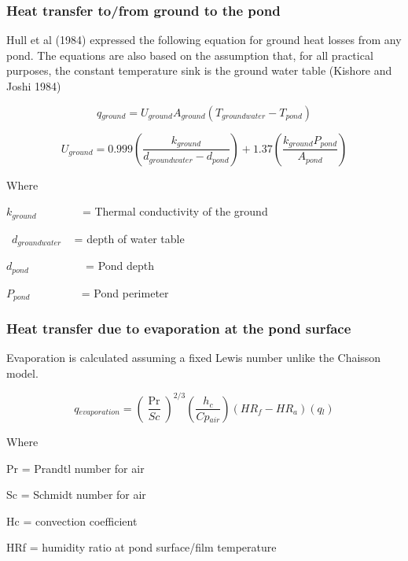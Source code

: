 \subsubsection{Heat transfer to/from ground to the pond}\label{heat-transfer-tofrom-ground-to-the-pond}

Hull et al (1984) expressed the following equation for ground heat losses from any pond. The equations are also based on the assumption that, for all practical purposes, the constant temperature sink is the ground water table (Kishore and Joshi 1984)

\begin{equation}
q{}_{ground} = U{}_{ground}A{}_{ground}(T{}_{groundwater} - T{}_{pond})
\end{equation}

\begin{equation}
U{}_{ground} = 0.999\left( {\frac{{k{}_{ground}}}{{d{}_{groundwater} - d{}_{pond}}}} \right) + 1.37\left( {\frac{{k{}_{ground}P{}_{pond}}}{{A{}_{pond}}}} \right)
\end{equation}

Where

\(k{}_{ground}\) ~~~~~~~ = Thermal conductivity of the ground

~\(d{}_{groundwater}\) ~ = depth of water table

\(d{}_{pond}\) ~~~~~~~~~ = Pond depth

\(P{}_{pond}\) ~~~~~~~~ = Pond perimeter

\subsubsection{Heat transfer due to evaporation at the pond surface}\label{heat-transfer-due-to-evaporation-at-the-pond-surface}

Evaporation is calculated assuming a fixed Lewis number unlike the Chaisson model.

\begin{equation}
q{}_{evaporation} = {\left( {\frac{{\Pr }}{{Sc}}} \right)^{2/3}}\left( {\frac{{h{}_c}}{{Cp{}_{air}}}} \right)\left( {HR{}_f - HR{}_a} \right)\left( {q{}_l} \right)
\end{equation}

Where

Pr = Prandtl number for air

Sc = Schmidt number for air

Hc = convection coefficient

HRf = humidity ratio at pond surface/film temperature

